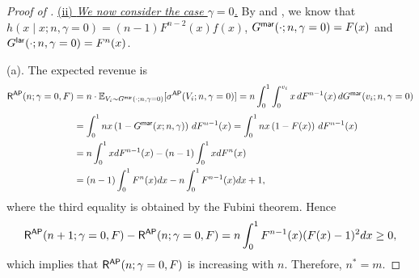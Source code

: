 \begin{proof}[{Proof of }]
\medskip
\noindent 
\underline{(ii) \textit{We now consider the case $\gamma = 0$.}} By  and , we know that $h(x\mid x;n,\gamma=0) = (n-1)F^{n-2}(x)f(x)$, $G^{\mathsf{mar}}(\cdot; n,\gamma=0) = F(x)$ and $G^{\mathsf{lar}}(\cdot; n,\gamma=0) = F^n(x)$.

\medskip

\noindent (a). The expected revenue is
\begin{align*}
 \mathsf{R}^{\mathsf{AP}}(n;\gamma=0,F) & = n\cdot \mathbb{E}_{V_i\sim G^{\mathsf{mar}}(\cdot; n,\gamma=0)}[\sigma^{\mathsf{AP}}(V_i;n,\gamma=0)]
 = n\int_0^1 \int_0^{v_i} x\, dF^{n-1}(x)\, dG^{\mathsf{mar}}(v_i;n,\gamma = 0)\\[1mm]
 &= \int_0^1 nx \left(1-G^{\mathsf{mar}}(x; n,\gamma)\right)\, dF^{n-1}(x) = \int_0^1 nx \left(1-F(x)\right)\, dF^{n-1}(x)\\
 & = n \int_0^1 xdF^{n-1}(x) - (n-1) \int_0^1 xdF^{n}(x)\\
 & = (n-1)\int_0^1 F^{n}(x)dx - n\int_0^1 F^{n-1}(x)dx + 1,
\end{align*}
where the third equality is obtained by the Fubini theorem.
Hence 
\begin{align*}
 \mathsf{R}^{\mathsf{AP}}(n+1;\gamma=0,F) - \mathsf{R}^{\mathsf{AP}}(n;\gamma=0,F) = n\int_0^1 F^{n-1}(x) (F(x) - 1)^2  dx \geq 0,
\end{align*}
which implies that $\mathsf{R}^{\mathsf{AP}}(n;\gamma=0,F)$ is increasing with $n$. Therefore, $n^* = m$.

\medskip


\end{proof}
